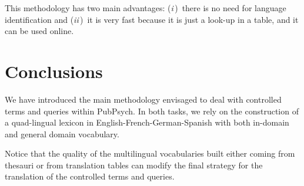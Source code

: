 \documentclass[a4paper,11pt]{article}
\newcommand{\Ni}{({\em i\,})~}
\newcommand{\Nii}{({\em ii\,})~}
\begin{document}
This methodology has two main advantages: \Ni there is no need for language identification and \Nii it is very fast because it is just a look-up in a table, and it can be used online.


% 
% 




\section{Conclusions}
\label{s:conclusions}

We have introduced the main methodology envisaged to deal with controlled terms and queries within PubPsych. In both tasks, we rely on the construction of a quad-lingual lexicon in English-French-German-Spanish with both in-domain and general domain vocabulary.

Notice that the quality of the multilingual vocabularies built either coming from thesauri or from translation tables can modify the final strategy for the translation of the controlled terms and queries.

%
%
% 
% 
\end{document}
